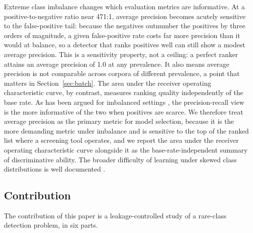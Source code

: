 \documentclass[11pt]{article}
\begin{document}
Extreme class imbalance changes which evaluation metrics are informative. At a positive-to-negative ratio near 471:1, average precision becomes acutely sensitive to the false-positive tail: because the negatives outnumber the positives by three orders of magnitude, a given false-positive rate costs far more precision than it would at balance, so a detector that ranks positives well can still show a modest average precision. This is a sensitivity property, not a ceiling: a perfect ranker attains an average precision of 1.0 at any prevalence. It also means average precision is not comparable across corpora of different prevalence, a point that matters in Section~\ref{sec:batch}. The area under the receiver operating characteristic curve, by contrast, measures ranking quality independently of the base rate. As has been argued for imbalanced settings \cite{saito}, the precision-recall view is the more informative of the two when positives are scarce. We therefore treat average precision as the primary metric for model selection, because it is the more demanding metric under imbalance and is sensitive to the top of the ranked list where a screening tool operates, and we report the area under the receiver operating characteristic curve alongside it as the base-rate-independent summary of discriminative ability. The broader difficulty of learning under skewed class distributions is well documented \cite{hegarcia}.

\subsection{Contribution}

The contribution of this paper is a leakage-controlled study of a rare-class detection problem, in six parts.
\end{document}
